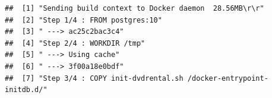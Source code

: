 \documentclass[]{book}
\theoremstyle{definition}
\theoremstyle{definition}
\theoremstyle{definition}
\theoremstyle{remark}
\begin{document}
\begin{verbatim}
##  [1] "Sending build context to Docker daemon  28.56MB\r\r"                                                                                                                                                                                                                                                                                                                                           
##  [2] "Step 1/4 : FROM postgres:10"                                                                                                                                                                                                                                                                                                                                                                   
##  [3] " ---> ac25c2bac3c4"                                                                                                                                                                                                                                                                                                                                                                            
##  [4] "Step 2/4 : WORKDIR /tmp"                                                                                                                                                                                                                                                                                                                                                                       
##  [5] " ---> Using cache"                                                                                                                                                                                                                                                                                                                                                                             
##  [6] " ---> 3f00a18e0bdf"                                                                                                                                                                                                                                                                                                                                                                            
##  [7] "Step 3/4 : COPY init-dvdrental.sh /docker-entrypoint-initdb.d/"                                                                                                                                                                                                                                                                                                                                

\end{verbatim}
\end{document}
